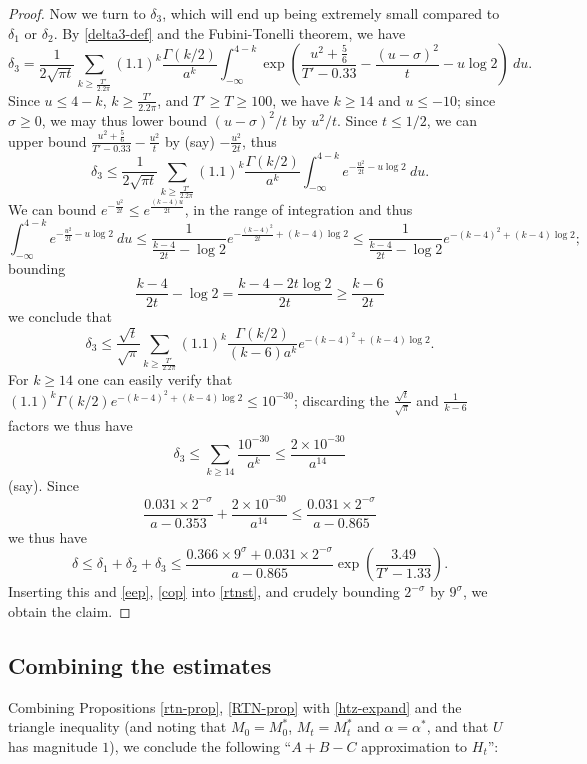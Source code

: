 \documentclass[a4paper,11pt,twoside]{amsart}
\begin{document}
\begin{proof}
Now we turn to $\delta_3$, which will end up being extremely small compared to $\delta_1$ or $\delta_2$. By \eqref{delta3-def} and the Fubini-Tonelli theorem, we have
$$ \delta_3 = \frac{1}{2 \sqrt{\pi t}} \sum_{k \geq \frac{T'}{2.2 \pi}} (1.1)^{k} \frac{\Gamma(k/2)}{a^k} \int_{-\infty}^{4-k} \exp\left( \frac{u^2 + \frac{5}{6}}{T'-0.33}  - \frac{(u-\sigma)^2}{t} - u \log 2\right)\ du.$$
Since $u \leq 4-k$, $k \geq \frac{T'}{2.2\pi}$, and $T' \geq T \geq 100$, we have $k \geq 14$ and $u \leq -10$; since $\sigma \geq 0$, we may thus lower bound $(u-\sigma)^2/t$ by $u^2/t$.  Since $t \leq 1/2$, we can upper bound $\frac{u^2 + \frac{5}{6}}{T'-0.33} - \frac{u^2}{t}$ by (say) $-\frac{u^2}{2t}$, thus
$$ \delta_3 \leq \frac{1}{2 \sqrt{\pi t}} \sum_{k \geq \frac{T'}{2.2 \pi}} (1.1)^{k} \frac{\Gamma(k/2)}{a^k} \int_{-\infty}^{4-k} e^{-\frac{u^2}{2t} - u \log 2}\ du.$$
We can bound $e^{-\frac{u^2}{2t}} \leq e^{\frac{(k-4)u}{2t}}$, in the range of integration and thus
$$ \int_{-\infty}^{4-k} e^{-\frac{u^2}{2t} - u \log 2}\ du \leq \frac{1}{\frac{k-4}{2t} - \log 2} e^{-\frac{(k-4)^2}{2t} + (k-4) \log 2} \leq \frac{1}{\frac{k-4}{2t} - \log 2} e^{-(k-4)^2 + (k-4) \log 2};$$
bounding
$$ \frac{k-4}{2t} - \log 2 = \frac{k-4-2t \log 2}{2t} \geq \frac{k-6}{2t}$$
we conclude that
$$ \delta_3 \leq \frac{\sqrt{t}}{\sqrt{\pi}} \sum_{k \geq \frac{T'}{2.2 \pi}} (1.1)^{k} \frac{\Gamma(k/2)}{(k-6) a^k} e^{-(k-4)^2 + (k-4) \log 2}.$$
For $k \geq 14$ one can easily verify that $(1.1)^{k} \Gamma(k/2) e^{-(k-4)^2 + (k-4) \log 2} \leq 10^{-30}$; discarding the $\frac{\sqrt{t}}{\sqrt{\pi}}$ and $\frac{1}{k-6}$ factors we thus have
$$ \delta_3 \leq \sum_{k \geq 14} \frac{10^{-30}}{a^k} \leq \frac{2 \times 10^{-30}}{a^{14}}$$
(say).   Since
$$ \frac{0.031 \times 2^{-\sigma}}{a-0.353} + \frac{2 \times 10^{-30}}{a^{14}} \leq \frac{0.031 \times 2^{-\sigma}}{a-0.865}$$
we thus have
$$ \delta \leq \delta_1+\delta_2+\delta_3 \leq \frac{0.366 \times 9^\sigma + 0.031 \times 2^{-\sigma}}{a-0.865} \exp\left( \frac{3.49}{T'-1.33} \right).$$
Inserting this and \eqref{eep}, \eqref{cop} into \eqref{rtnst}, and crudely bounding $2^{-\sigma}$ by $9^\sigma$, we obtain the claim.
\end{proof}

\subsection{Combining the estimates}


Combining Propositions \ref{rtn-prop}, \ref{RTN-prop} with \eqref{htz-expand} and the triangle inequality (and noting that $M_0 = M_0^*$, $M_t = M_t^*$ and $\alpha = \alpha^*$, and that $U$ has magnitude $1$), we conclude the following ``$A+B-C$ approximation to $H_t$'':
\end{document}
